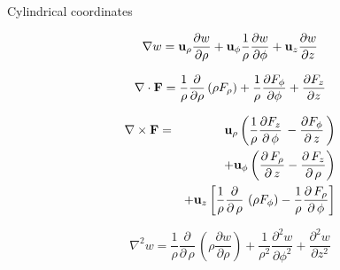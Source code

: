 \documentclass[handout,10pt]{beamer}
\begin{document}
\begin{frame}[shrink=00]{Cylindrical coordinates}



%
\begin{equation}
 \nabla w = {\bf u}_\rho \frac{\partial w}{\partial \rho} + {\bf u}_\phi \frac{1}{\rho} \frac{\partial w}{\partial \phi} + {\bf u}_z \frac{\partial w}{\partial z} 
  \label{graddefc}
\end{equation}
%


%
\begin{equation}
 \nabla \cdot {\bf F} = \frac{1}{\rho} \frac{\partial}{\partial \rho} \left(\rho F_\rho \right) +  
\frac{1}{\rho}  \frac{\partial F_\phi}{\partial \phi} +  \frac{\partial F_z}{\partial z}
 \label{divdefc}
\end{equation}
%



%
\begin{eqnarray}
 \nabla \times {\bf F} & =  &
{\bf u}_\rho \left( \frac{1}{\rho} \frac{\partial {F}_{z}}{\partial\,\phi}\,-\frac{\partial {F}_{\phi}}{\partial\,z}\,\right) \nonumber \\
& & + {\bf u}_\phi \left(\frac{\partial \,{F}_{\rho}}{\partial\,z}-\frac{\partial \,{F}_{z}}{\partial\,\rho}\right) \nonumber \\
& &  +  {\bf u}_z \left[ \frac{1}{\rho}  \frac{\partial }{\partial\,\rho}\,\left( \rho {F}_{\phi}\right) -  \frac{1}{\rho} \frac{\partial \,{F}_{\rho}}{\partial\,\phi}\right]
 \label{curldefc}
\end{eqnarray}
%


%
\begin{equation}
 \nabla^2 w =  \frac{1}{\rho} \frac{\partial }{\partial\,\rho}\,\left( \rho \frac{\partial w}{\partial \rho} \right) + 
 \frac{1}{\rho^2} \frac{\partial^2 w}{\partial \phi^2} +  \frac{\partial^2 w}{\partial z^2} 
 \label{Laplacianc}
\end{equation}
%



\end{frame}
\end{document}

